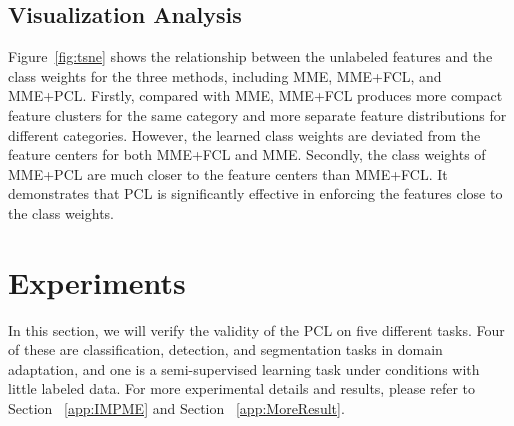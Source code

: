 \subsection{Visualization Analysis}
Figure~\ref{fig:tsne} shows the relationship between the unlabeled features and the class weights for the three methods, including MME, MME+FCL, and MME+PCL.
Firstly, compared with MME, MME+FCL produces more compact feature clusters for the same category and more separate feature distributions for different categories. However, the learned class weights are deviated from the feature centers for both MME+FCL and MME.
Secondly, the class weights of MME+PCL are much closer to the feature centers than MME+FCL. It demonstrates that PCL is significantly effective in enforcing the features close to the class weights.

\section{Experiments}
In this section, we will verify the validity of the PCL on five different tasks. Four of these are classification, detection, and segmentation tasks in domain adaptation, and one is a semi-supervised learning task under conditions with little labeled data. For more experimental details and results, please refer to Section ~\ref{app:IMPME} and Section ~\ref{app:MoreResult}.


